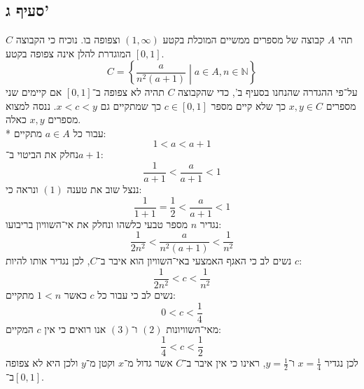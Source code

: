 \documentclass[a4paper]{article}
\def\NN{\mathbb{N}}
\begin{document}
\subsection{סעיף ג'}
תהי $A$ קבוצה של מספרים ממשיים המוכלת בקטע $(1, \infty)$ וצפופה בו.
נוכיח כי הקבוצה $C$ המוגדרת להלן אינה צפופה בקטע $[0, 1]$.
\[
	C = \left\{ \frac{a}{n^2(a + 1)} \middle| a \in A, n \in \NN \right\}
\]
על־פי ההגדרה שהנחנו בסעיף ב',
כדי שהקבוצה $C$ תהיה לא צפופה ב־$[0, 1]$
אם קיימים שני מספרים $x, y \in C$ כך שלא קיים מספר $c \in [0, 1]$
כך שמתקיים גם $x < c < y$.
ננסה למצוא מספרים $x, y$ כאלה. \\*
עבור כל $a \in A$ מתקיים:
\[
	1 < a < a + 1 \tag{1}
\]
נחלק את הביטוי ב־$a + 1$:
\[
	\frac{1}{a + 1} < \frac{a}{a + 1} < 1
\]
ננצל שוב את טענה $(1)$ ונראה כי:
\[
	\frac{1}{1 + 1} = \frac{1}{2} < \frac{a}{a + 1} < 1 \tag{2}
\]
נגדיר $n$ מספר טבעי כלשהו ונחלק את אי־השוויון בריבועו:
\[
	\frac{1}{2n^2} < \frac{a}{n^2 (a + 1)} < \frac{1}{n^2}
\]
נשים לב כי האגף האמצעי באי־השוויון הוא איבר ב־$C$,
לכן נגדיר אותו להיות $c$:
\[
	\frac{1}{2n^2} < c < \frac{1}{n^2}
\]
נשים לב כי עבור כל $c$ כאשר $1 < n$ מתקיים:
\[
	0 < c < \frac{1}{4} \tag{3}
\]
מאי־השוויונות $(2)$ ו־$(3)$ אנו רואים כי אין $c$ המקיים:
\[
	\frac{1}{4} < c < \frac{1}{2}
\]
לכן נגדיר $x = \frac{1}{4}$ ו־$y = \frac{1}{2}$,
ראינו כי אין איבר ב־$C$ אשר גדול מ־$x$ וקטן מ־$y$
ולכן היא לא צפופה ב־$[0, 1]$.
\end{document}
